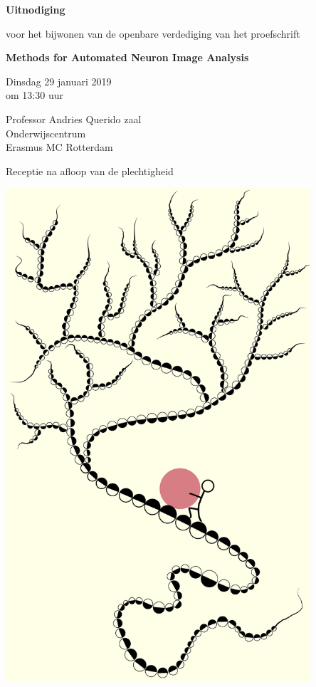 \documentclass[10pt]{report}
\begin{document}
\pagestyle{empty}
\setlength{\leftmargini}{0em}

\begin{center}
	
  	{\Large\bf Uitnodiging}

  	\bigskip

  	voor het bijwonen van de openbare verdediging van het proefschrift

  	\bigskip
  	\bigskip
	
  	{\Large\bf  Methods for Automated Neuron Image Analysis}%

  	\bigskip
  	\bigskip
  
  	Dinsdag 29 januari 2019\\om 13:30 uur
  
  	\bigskip
  	\bigskip
  
  	Professor Andries Querido zaal\\
  	Onderwijscentrum\\%
  	Erasmus MC Rotterdam
  
  	\bigskip
  	\bigskip
  
 	Receptie na afloop van de plechtigheid
  
 	\bigskip
 	\bigskip

	\includegraphics[width=0.85\textwidth]{syziphus}


\end{center}
\end{document}

